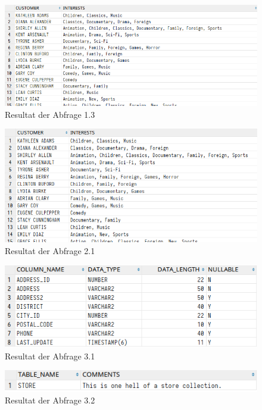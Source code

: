 \documentclass[notitlepage]{article}
\begin{document}
	\begin{figure}[H]\centering
		\includegraphics[width=\textwidth]{images/1_3.png}
		\caption{Resultat der Abfrage 1.3}
	\end{figure}

	\begin{figure}[H]\centering
		\includegraphics[width=\textwidth]{images/2_1.png}
		\caption{Resultat der Abfrage 2.1}
	\end{figure}

	\begin{figure}[H]\centering
		\includegraphics[width=\textwidth]{images/3_1.png}
		\caption{Resultat der Abfrage 3.1}
	\end{figure}

	\begin{figure}[H]\centering
		\includegraphics[width=\textwidth]{images/3_2.png}
		\caption{Resultat der Abfrage 3.2}
	\end{figure}
\end{document}
